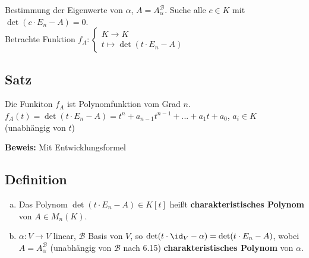   Bestimmung der Eigenwerte von $\alpha$, $A=A_\alpha^{\mathcal{B}}$. Suche alle $c\in
  K$ mit $\det(c\cdot E_n-A)=0$.\\
  Betrachte Funktion $f_A:\begin{cases}K\rightarrow K\\t\mapsto\det(t\cdot
  E_n-A)\end{cases}$

\subsection{Satz}
  Die Funkiton $f_A$ ist Polynomfunktion vom Grad $n$.\\
  $f_A(t)=\det(t\cdot E_n-A)=t^n+a_{n-1}t^{n-1}+...+a_1t+a_0$, $a_i\in K$
  (unabhängig von $t$)

  \textbf{Beweis:} Mit Entwicklungsformel

\subsection{Definition}
  \begin{enumerate}[a)]
    \item Das Polynom $\det(t\cdot E_n-A)\in K[t]$ heißt
      \textbf{charakteristisches Polynom} von $A\in M_n(K)$.
    \item $\alpha:V\rightarrow V$ linear, $\mathcal{B}$ Basis von $V$, so
      $\det(t\cdot\id_V-\alpha)=\det(t\cdot E_n-A)$, wobei
      $A=A_\alpha^{\mathcal{B}}$ (unabhängig von ${\mathcal{B}}$ nach 6.15)
      \textbf{charakteristisches Polynom} von $\alpha$.
  \end{enumerate}

